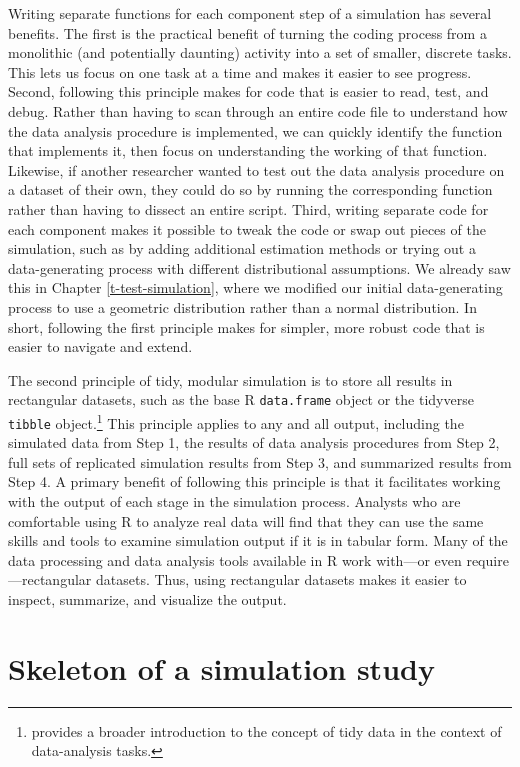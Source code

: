 \documentclass[
]{book}
\begin{document}
Writing separate functions for each component step of a simulation has several benefits.
The first is the practical benefit of turning the coding process from a monolithic (and potentially daunting) activity into a set of smaller, discrete tasks.
This lets us focus on one task at a time and makes it easier to see progress.
Second, following this principle makes for code that is easier to read, test, and debug.
Rather than having to scan through an entire code file to understand how the data analysis procedure is implemented, we can quickly identify the function that implements it, then focus on understanding the working of that function.
Likewise, if another researcher wanted to test out the data analysis procedure on a dataset of their own, they could do so by running the corresponding function rather than having to dissect an entire script.
Third, writing separate code for each component makes it possible to tweak the code or swap out pieces of the simulation, such as by adding additional estimation methods or trying out a data-generating process with different distributional assumptions.
We already saw this in Chapter \ref{t-test-simulation}, where we modified our initial data-generating process to use a geometric distribution rather than a normal distribution.
In short, following the first principle makes for simpler, more robust code that is easier to navigate and extend.

The second principle of tidy, modular simulation is to store all results in rectangular datasets, such as the base R \texttt{data.frame} object or the tidyverse \texttt{tibble} object.\footnote{\citet{Wickham2014tidydata} provides a broader introduction to the concept of tidy data in the context of data-analysis tasks.}
This principle applies to any and all output, including the simulated data from Step 1, the results of data analysis procedures from Step 2, full sets of replicated simulation results from Step 3, and summarized results from Step 4.
A primary benefit of following this principle is that it facilitates working with the output of each stage in the simulation process.
Analysts who are comfortable using R to analyze real data will find that they can use the same skills and tools to examine simulation output if it is in tabular form.
Many of the data processing and data analysis tools available in R work with---or even require---rectangular datasets.
Thus, using rectangular datasets makes it easier to inspect, summarize, and visualize the output.

\section{Skeleton of a simulation study}\label{skeleton-of-a-simulation-study}
\end{document}
